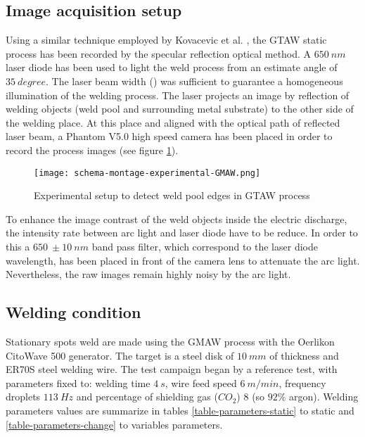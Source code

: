 \begin{Segmentation}
\subsection{ Image acquisition setup}
\label{ image_acquisition_setup}

Using a similar technique employed by Kovacevic et al. \cite{KOVACEVIC}, the GTAW static process has been recorded by the specular reflection optical method. A $650\ nm$ laser diode has been used to light the weld process from an estimate angle of $35\ degree$. The laser beam width ($ $) was sufficient to guarantee a homogeneous illumination of the welding process. The laser projects an image by reflection of welding objects (weld pool and surrounding metal substrate) to the other side of the welding place. At this place and aligned with the optical path of reflected laser beam, a Phantom V5.0 high speed camera has been placed in order to record the process images (see figure \ref{schema-montage-experimental-GTAW}). 

\begin{figure}
\begin{center}
\texttt{[image: schema-montage-experimental-GMAW.png]}
\caption{{\small Experimental setup to detect weld pool edges in GTAW process}}
\label{schema-montage-experimental-GTAW}
\end{center}
\end{figure}

To enhance the image contrast of the weld objects inside the electric discharge, the intensity rate between arc light and laser diode have to be reduce. In order to this a $650\ \pm 10\ nm$ band pass filter, which correspond to the laser diode wavelength, has been placed in front of the camera lens to attenuate the arc light. Nevertheless, the raw images remain highly noisy by the arc light. 


\subsection{ Welding condition}
\label{ welding_conditions}

Stationary spots weld are made using the GMAW process with the Oerlikon CitoWave 500 generator. The target is a steel disk of $10\ mm$ of thickness and ER70S steel welding wire.
The test campaign began by a reference test, with parameters fixed to:  welding time $4\ s$, wire feed speed $6\ m/min$, frequency droplets $113\ Hz$ and percentage of shielding gas ($CO_{2}$) $8$ (so $92\%$ argon). Welding parameters values are summarize in tables \ref{table-parameters-static} to static and \ref{table-parameters-change} to variables parameters.


\end{Segmentation}
